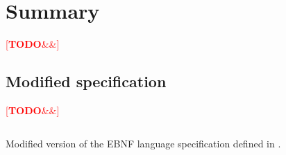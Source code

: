 \documentclass[english,engineering]{wizthesis}
\newcommand{\todo}[1]{%
  \textcolor{red}{[\textbf{TODO}\ifx&#1&{}\else{ }\fi\emph{#1}]}%
}
\begin{document}






\chapter{Summary}

\todo{}



\listoffigures

\listoftables

\listoflistings

\begin{appendices}

\chapter{Modified specification} \label{ch:modified-spec}

\todo{}

\begin{listing}[H]
  \inputminted[fontsize=\small,frame=lines,breaklines,linenos]
    {lexers/ebnf_lexer.py:EbnfLexer -x}{listings/specification.ebnf}
  \caption{Modified version of the EBNF language specification defined in
  \cite{iso-14977}.}
  \label{lst:specification}
\end{listing}

\end{appendices}
\end{document}
